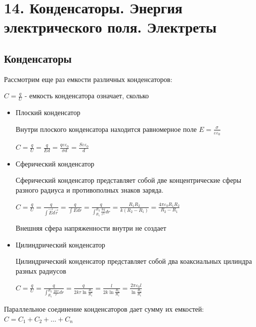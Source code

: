 \documentclass[12pt]{article}
\begin{document}






\section{14. Конденсаторы. Энергия электрического поля. Электреты}

\subsection{Конденсаторы}

Рассмотрим еще раз емкости различных конденсаторов:

$C = \frac{q}{U}$ - емкость конденсатора означает, сколько 

\begin{itemize}
    \item Плоский конденсатор

    Внутри плоского конденсатора находится равномерное поле $E = \frac{\sigma}{\varepsilon\varepsilon_0}$

    $C = \frac{q}{U} = \frac{q}{Ed} = \frac{q \varepsilon \varepsilon_0}{\sigma d} = \frac{S \varepsilon \varepsilon_0}{d}$

    \item Сферический конденсатор

    Сферический конденсатор представляет собой две концентрические сферы разного радиуса и противополных знаков заряда.

    $C = \frac{q}{U} = \frac{q}{\int \vec{E}d\vec{r}} = \frac{q}{\int Edr} = \frac{q}{\int_{R_1}^{R_2} \frac{kq}{r^2} dr} = \frac{R_1 R_2}{k(R_2 - R_1)} = \frac{4\pi \varepsilon_0 R_1 R_2}{R_2 - R_1}$

    Внешняя сфера напряженности внутри не создает

    \item Цилиндрический конденсатор

    Цилиндрический конденсатор представляет собой два коаксиальных цилиндра разных радиусов

    $C = \frac{q}{U} = \frac{q}{\int_{R_1}^{R_2} \frac{2k\tau}{r} dr} = \frac{q}{2k\tau \ln\frac{R_2}{R_1}} = \frac{l}{2k\ln\frac{R_2}{R_1}} = \frac{2\pi \varepsilon_0 l}{\ln \frac{R_2}{R_1}}$

\end{itemize}

Параллельное соединение конденсаторов дает сумму их емкостей: $C = C_1 + C_2 + \dots + C_n$
\end{document}
